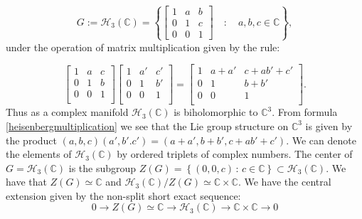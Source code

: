 \documentclass[A4paper,11pt]{amsart}
\newcommand{\C}{\mathbb{C}}
\newcommand{\He}{\mathcal{H}_3(\C)}
\theoremstyle{definition}
\theoremstyle{named}
\begin{document}
\begin{equation}
G:=\mathcal{H}_3(\C)=\left\{\begin{bmatrix}
1 & a &  b\\
0 & 1 & c\\
0 & 0 & 1\end{bmatrix}\quad : \quad a,b,c \in\C\right\},
\end{equation}
under the operation of matrix multiplication given by the rule:
 
\begin{equation}\label{heisenbergmultiplication}{\begin{bmatrix}1&a&c\\0&1&b\\0&0&1\\\end{bmatrix}}{\begin{bmatrix}1&a'&c'\\0&1&b'\\0&0&1\\\end{bmatrix}}={\begin{bmatrix}1&a+a'&c+ab'+c'\\0&1&b+b'\\0&0&1\\\end{bmatrix}}.\end{equation}
Thus as a complex manifold $\mathcal{H}_3(\C)$ is biholomorphic to $\C^3$. From formula
\ref{heisenbergmultiplication} we see that the Lie group structure on $\C^3$ is given by the product
$(a,b,c)(a',b'.c')=(a+a',b+b', c+ab'+c')$. We can denote  the elements of $\He$ by  ordered triplets of complex numbers.  The center of $G=\He$ is the subgroup $Z(G)=\left\{(0,0,c)\,:\, c\in\C\right\}\subset\He$. We have that $Z(G)\simeq\C$ and $\He/Z(G)\simeq{\C\times\C}$. We have the central extension given by the non-split short exact sequence:
\begin{equation}\label{centerexseq}
0\longrightarrow{Z(G)}\simeq\C\longrightarrow\He\longrightarrow\C\times\C\longrightarrow0
\end{equation}
 
\end{document}
